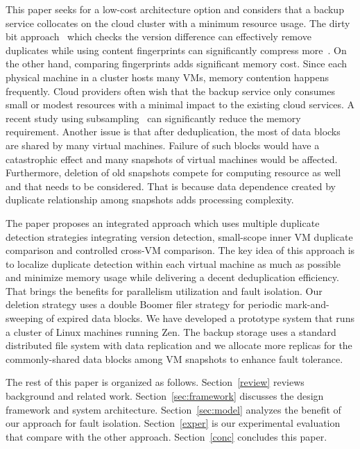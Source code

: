 This paper seeks for a low-cost architecture option and considers that
a backup service collocates  on  the cloud cluster with a minimum resource usage. 
The dirty bit approach~\cite{??}  which checks the version difference can effectively remove
duplicates while using content fingerprints can significantly compress more~\cite{Bottlneck08}.
On the other hand, comparing fingerprints  adds significant  memory cost. 
Since each physical machine in a cluster  hosts many VMs, memory contention happens frequently.
Cloud providers often wish that the backup service only consumes  small or modest resources
with a minimal impact to the existing cloud services.  A 
recent study using subsampling~\cite{Guo2011}  can significantly reduce the memory requirement.
Another issue is that after deduplication, the most of data blocks are shared by many virtual machines.
Failure of such blocks would  have a catastrophic effect and many snapshots of virtual machines would be affected.
Furthermore, 
deletion of old snapshots compete for computing resource as well and that  needs
to be considered. That is  because data dependence created
by duplicate relationship among snapshots  adds processing complexity.

The paper proposes an integrated approach which uses  multiple duplicate detection strategies
integrating  version  detection, small-scope inner VM duplicate comparison
and controlled cross-VM comparison. 
The key idea of this approach is to localize duplicate detection within each virtual machine as much as possible
and minimize memory usage while delivering a decent deduplication efficiency. 
That brings the benefits for parallelism  utilization and fault isolation.
Our deletion strategy uses a double Boomer filer strategy for periodic mark-and-sweeping of expired data blocks.
We have developed a prototype system that runs a cluster of Linux machines running Zen.
The backup storage uses a standard distributed file system  with data replication and
we allocate more  replicas for the commonly-shared  data blocks among VM snapshots to enhance fault tolerance.



The rest of this paper is organized as follows.
Section~\ref{review} reviews background and related work.
Section~\ref{sec:framework}  discusses the  design framework and system architecture.
Section~\ref{sec:model}  analyzes the benefit of our approach for fault isolation. 
Section~\ref{exper} is our experimental evaluation that compare with the other approach.
Section~\ref{conc}  concludes this paper.

